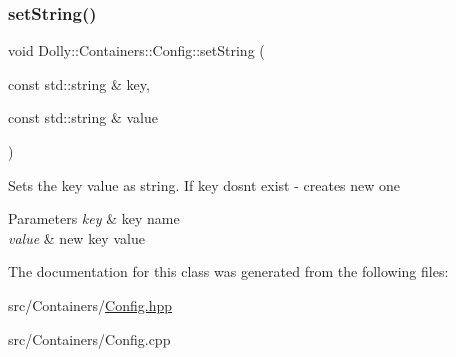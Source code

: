 \subsubsection{\texorpdfstring{set\+String()}{setString()}}
{\footnotesize\ttfamily void Dolly\+::\+Containers\+::\+Config\+::set\+String (\begin{DoxyParamCaption}\item[{const std\+::string \&}]{key,  }\item[{const std\+::string \&}]{value }\end{DoxyParamCaption})}

Sets the key value as string. If key dosn\textquotesingle{}t exist -\/ creates new one 
\begin{DoxyParams}{Parameters}
{\em key} & key name \\
\hline
{\em value} & new key value \\
\hline
\end{DoxyParams}


The documentation for this class was generated from the following files\+:\begin{DoxyCompactItemize}
\item 
src/\+Containers/\hyperlink{_config_8hpp}{Config.\+hpp}\item 
src/\+Containers/Config.\+cpp\end{DoxyCompactItemize}
